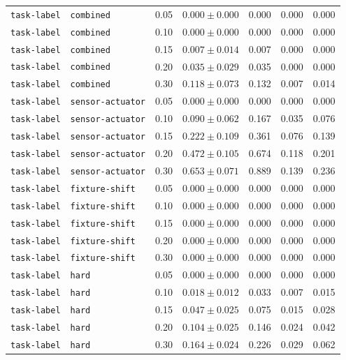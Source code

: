 \documentclass{article}
\begin{document}
\begin{center}
\begin{tabular}{lllcccc}
\texttt{task-label} & \texttt{combined} & 0.05 & $0.000 \pm 0.000$ & 0.000 & 0.000 & 0.000 \\
\texttt{task-label} & \texttt{combined} & 0.10 & $0.000 \pm 0.000$ & 0.000 & 0.000 & 0.000 \\
\texttt{task-label} & \texttt{combined} & 0.15 & $0.007 \pm 0.014$ & 0.007 & 0.000 & 0.000 \\
\texttt{task-label} & \texttt{combined} & 0.20 & $0.035 \pm 0.029$ & 0.035 & 0.000 & 0.000 \\
\texttt{task-label} & \texttt{combined} & 0.30 & $0.118 \pm 0.073$ & 0.132 & 0.007 & 0.014 \\
\texttt{task-label} & \texttt{sensor-actuator} & 0.05 & $0.000 \pm 0.000$ & 0.000 & 0.000 & 0.000 \\
\texttt{task-label} & \texttt{sensor-actuator} & 0.10 & $0.090 \pm 0.062$ & 0.167 & 0.035 & 0.076 \\
\texttt{task-label} & \texttt{sensor-actuator} & 0.15 & $0.222 \pm 0.109$ & 0.361 & 0.076 & 0.139 \\
\texttt{task-label} & \texttt{sensor-actuator} & 0.20 & $0.472 \pm 0.105$ & 0.674 & 0.118 & 0.201 \\
\texttt{task-label} & \texttt{sensor-actuator} & 0.30 & $0.653 \pm 0.071$ & 0.889 & 0.139 & 0.236 \\
\texttt{task-label} & \texttt{fixture-shift} & 0.05 & $0.000 \pm 0.000$ & 0.000 & 0.000 & 0.000 \\
\texttt{task-label} & \texttt{fixture-shift} & 0.10 & $0.000 \pm 0.000$ & 0.000 & 0.000 & 0.000 \\
\texttt{task-label} & \texttt{fixture-shift} & 0.15 & $0.000 \pm 0.000$ & 0.000 & 0.000 & 0.000 \\
\texttt{task-label} & \texttt{fixture-shift} & 0.20 & $0.000 \pm 0.000$ & 0.000 & 0.000 & 0.000 \\
\texttt{task-label} & \texttt{fixture-shift} & 0.30 & $0.000 \pm 0.000$ & 0.000 & 0.000 & 0.000 \\
\texttt{task-label} & \texttt{hard} & 0.05 & $0.000 \pm 0.000$ & 0.000 & 0.000 & 0.000 \\
\texttt{task-label} & \texttt{hard} & 0.10 & $0.018 \pm 0.012$ & 0.033 & 0.007 & 0.015 \\
\texttt{task-label} & \texttt{hard} & 0.15 & $0.047 \pm 0.025$ & 0.075 & 0.015 & 0.028 \\
\texttt{task-label} & \texttt{hard} & 0.20 & $0.104 \pm 0.025$ & 0.146 & 0.024 & 0.042 \\
\texttt{task-label} & \texttt{hard} & 0.30 & $0.164 \pm 0.024$ & 0.226 & 0.029 & 0.062 \\

\end{tabular}
\end{center}
\end{document}
